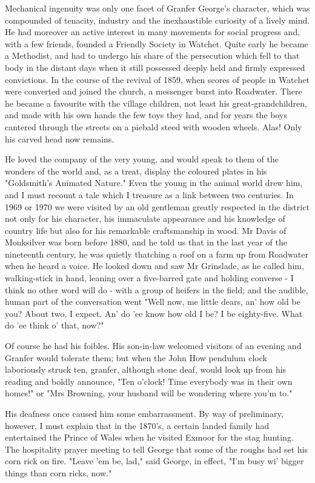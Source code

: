 Mechanical ingenuity was only one facet of Granfer George's character, which was compounded of tenacity, industry and the inexhaustible curiosity of a lively mind. He had moreover an active interest in many movements for social progress and, with a few friends, founded a Friendly Society in Watchet. Quite early he became a Methodist, and had to undergo his share of the persecution which fell to that body in the distant days when it still possessed deeply held and firmly expressed convictions. In the course of the revival of 1859, when scores of people in Watchet were converted and joined the church, a messenger burst into Roadwater. There he became a favourite with the village children, not least his great-grandchildren, and made with his own hands the few toys they had, and for years the boys cantered through the streets on a piebald steed with wooden wheels. Alas! Only his carved head now remains.

He loved the company of the very young, and would speak to them of the wonders of the world and, as a treat, display the coloured plates in his "Goldsmith’s Animated Nature." Even the young in the animal world drew him, and I must recount a tale which I treasure as a link between two centuries. In 1969 or 1970 we were visited by an old gentleman greatly respected in the district not only for his character, his immaculate appearance and his knowledge of country life but also for his remarkable craftsmanship in wood. Mr Davis of Monksilver was born before 1880, and he told us that in the last year of the nineteenth century, he was quietly thatching a roof on a farm up from Roadwater when he heard a voice. He looked down and saw Mr Grinslade, as he called him, walking-stick in hand, leaning over a five-barred gate and holding converse - I think no other word will do - with a group of heifers in the field; and the audible, human part of the conversation went "Well now, me little dears, an' how old be you? About two, I expect. An' do 'ee know how old I be? I be eighty-five. What do 'ee think o’ that, now?"

Of course he had his foibles. His son-in-law welcomed visitors of an evening and Granfer would tolerate them; but when the John How pendulum clock laboriously struck ten, granfer, although stone deaf, would look up from his reading and boldly announce, "Ten o'clock! Time everybody was in their own homes!" or "Mrs Browning, your husband will be wondering where you'm to."

His deafness once caused him some embarrassment. By way of preliminary, however, I must explain that in the 1870's, a certain landed family had entertained the Prince of Wales when he visited Exmoor for the stag hunting. The hospitality prayer meeting to tell George that some of the roughs had set his corn rick on fire. "Leave 'em be, lad," said George, in effect, "I'm busy wi' bigger things than corn ricks, now."


